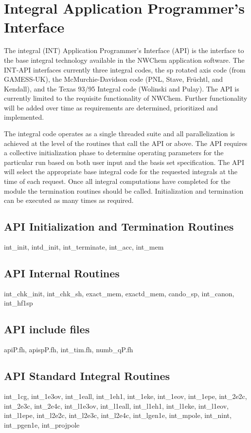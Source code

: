 \section{Integral Application Programmer's Interface}
The integral (INT) Application Programmer's Interface (API) is the
interface to the base integral technology available in the NWChem
application software.  The INT-API interfaces currently three integral
codes, the sp rotated axis code (from GAMESS-UK), the
McMurchie-Davidson code (PNL, Stave, Fr\"uchtl, and Kendall), and the
Texas 93/95 Integral code (Wolinski and Pulay).  The API is currently
limited to the requisite functionality of NWChem.  Further
functionality will be added over time as requirements are determined,
prioritized and implemented.  

The integral code operates as a single threaded suite and all
parallelization is achieved at the level of the routines that call the
API or above.  The API requires a collective initialization phase to
determine operating parameters for the particular run based on both
user input and the basis set specification.  The API will select the
appropriate base integral code for the requested integrals at the time
of each request.  Once all integral computations have completed for
the module the termination routines should be called.  Initialization
and termination can be executed as many times as required.  

\subsection{API Initialization and Termination Routines}
int\_init, intd\_init, int\_terminate, int\_acc, int\_mem

 
\subsection{API Internal Routines}
int\_chk\_init, int\_chk\_sh, exact\_mem, exactd\_mem, cando\_sp, int\_canon,
int\_hf1sp
 
\subsection{API include files}
apiP.fh, apispP.fh, int\_tim.fh, numb\_qP.fh

\subsection{API Standard Integral Routines}
int\_1cg, int\_1e3ov, int\_1eall, int\_1eh1, int\_1eke, int\_1eov, int\_1epe,
int\_2e2c, int\_2e3c, int\_2e4c, int\_l1e3ov, int\_l1eall, int\_l1eh1,
int\_l1eke, int\_l1eov, int\_l1epe, int\_l2e2c, int\_l2e3c, int\_l2e4c,
int\_lgen1e, int\_mpole, int\_nint, int\_pgen1e, int\_projpole

